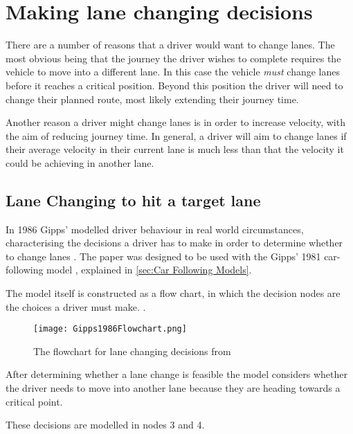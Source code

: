 \section{Making lane changing decisions}
\label{sec:Making lane changing decisions}
There are a number of reasons that a driver would want to change lanes. The most obvious being that the journey the driver wishes to complete requires the vehicle to move into a different lane. In this case the vehicle \emph{must} change lanes before it reaches a critical position. Beyond this position the driver will need to change their planned route, most likely extending their journey time. 

Another reason a driver might change lanes is in order to increase velocity, with the aim of reducing journey time. In general, a driver will aim to change lanes if their average velocity in their current lane is much less than that the velocity it could be achieving in another lane.

\subsection{Lane Changing to hit a target lane}
\label{subsec:Lane Changing to hit a target lane}
In 1986 Gipps' modelled driver behaviour in real world circumstances, characterising the decisions a driver has to make in order to determine whether to change lanes \citep{Gipps1986}. The paper was designed to be used with the Gipps' 1981 car-following model \citep{Gipps1981}, explained in \ref{sec:Car Following Models}.

The model itself is constructed as a flow chart, in which the decision nodes are the choices a driver must make. .

\begin{figure}[htb]
\texttt{[image: Gipps1986Flowchart.png]}
\caption{The flowchart for lane changing decisions from \citep{Gipps1986}}
\label{fig:Gipps1986Flowchart}
\end{figure}

After determining whether a lane change is feasible the model considers whether the driver needs to move into another lane because they are heading towards a critical point.

These decisions are modelled in nodes 3 and 4.

